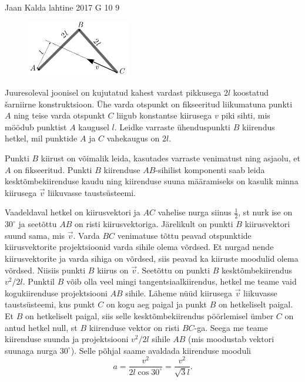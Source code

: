{Jaan Kalda} %
{lahtine} %
{2017} %
{G 10} %
{9} %
{
\ifStatement
\begin{figure}
	\vspace{-10pt}
	\includegraphics[width = 0.4\textwidth] {2017-lahg-10-delta.pdf}
\end{figure}

Juuresoleval joonisel on kujutatud kahest vardast pikkusega $2l$ koostatud \v sarniirne konstruktsioon. Ühe varda otspunkt on fikseeritud liikumatuna punkti $A$ ning teise varda otspunkt $C$ liigub konstantse kiirusega $v$ piki sihti, mis möödub punktist $A$ kaugusel $l$. Leidke varraste ühenduspunkti $B$ kiirendus hetkel, mil punktide $A$ ja $C$ vahekaugus on $2l$.
\fi


\ifHint
Punkti $B$ kiirust on võimalik leida, kasutades varraste venimatust ning asjaolu, et $A$ on fikseeritud. Punkti $B$ kiirenduse $AB$-sihilist komponenti saab leida kesktõmbekiirenduse kaudu ning kiirenduse suuna määramiseks on kasulik minna kiirusega $\vec{v}$ liikuvasse taustsüsteemi.
\fi


\ifSolution
Vaadeldaval hetkel on kiirusvektori ja $AC$ vahelise nurga siinus $\frac 12$, st nurk ise on $30^\circ$ ja seetõttu $AB$ on risti kiirusvektoriga. Järelikult on punkti $B$ kiirusvektori suund sama, mis $\vec v$. Varda $BC$ venimatuse tõttu peavad otspunktide kiirusvektorite projektsioonid varda sihile olema võrdsed. Et nurgad nende kiirusvektorite ja varda sihiga on võrdsed, siis peavad ka kiiruste moodulid olema võrdsed. Niisiis punkti $B$ kiirus on $\vec v$. Seetõttu on punkti $B$ kesktõmbekiirendus $v^2/2l$. Punktil $B$ võib olla veel mingi tangentsiaalkiirendus, hetkel me teame vaid kogukiirenduse projektsiooni $AB$ sihile. Läheme nüüd kiirusega $\vec v$ liikuvasse taustsüsteemi, kus punkt $C$ on kogu aeg paigal ja punkt $B$ on hetkeliselt paigal. Et $B$ on hetkeliselt paigal, siis selle kesktõmbekiirendus pöörlemisel ümber $C$ on antud hetkel null, st $B$ kiirenduse vektor on risti $BC$-ga. Seega me teame kiirenduse suunda ja projektsiooni $v^2/2l$ sihile $AB$ (mis moodustab vektori suunaga nurga $30^\circ$). Selle põhjal saame avaldada kiirenduse mooduli
\[
a=\frac{v^2}{2l\cos30^\circ}=\frac{v^2}{\sqrt 3l}.
\]
\fi


}
